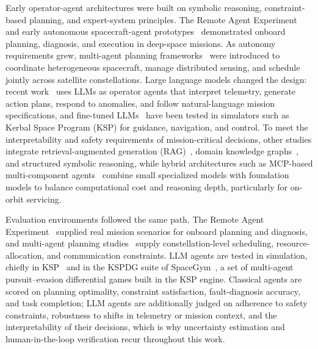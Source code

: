 Early operator-agent architectures were built on symbolic reasoning, constraint-based planning, and expert-system principles.
The Remote Agent Experiment~\cite{bernard1998designremoteagent} and early autonomous spacecraft-agent prototypes~\cite{pell1997autonomousspacecraftagent} demonstrated onboard planning, diagnosis, and execution in deep-space missions.
As autonomy requirements grew, multi-agent planning frameworks~\cite{colby2016autonomousmultiagent,picard2021autonomousAgents} were introduced to coordinate heterogeneous spacecraft, manage distributed sensing, and schedule jointly across satellite constellations.
Large language models changed the design: recent work~\cite{rodriguez2024languagemodelsspacecraft,carrasco2025visualoperatoragents} uses LLMs as operator agents that interpret telemetry, generate action plans, respond to anomalies, and follow natural-language mission specifications, and fine-tuned LLMs~\cite{zucchelli2025finetunellmSpace,carrasco2024finetuneAutonomousSpacecraft,foutter2024spacellava,carrasco2025llmAutonomousSpacecraft} have been tested in simulators such as Kerbal Space Program (KSP) for guidance, navigation, and control. To meet the interpretability and safety requirements of mission-critical decisions, other studies integrate retrieval-augmented generation (RAG)~\cite{belo2025languageragSpaceSpace}, domain knowledge graphs~\cite{powell2025questionknowledgegraphssatellite}, and structured symbolic reasoning, while hybrid architectures such as MCP-based multi-component agents~\cite{wu2025spacemind} combine small specialized models with foundation models to balance computational cost and reasoning depth, particularly for on-orbit servicing.

Evaluation environments followed the same path.
The Remote Agent Experiment~\cite{bernard1998designremoteagent} supplied real mission scenarios for onboard planning and diagnosis, and multi-agent planning studies~\cite{colby2016autonomousmultiagent} supply constellation-level scheduling, resource-allocation, and communication constraints.
LLM agents are tested in simulation, chiefly in KSP~\cite{carrasco2025llmAutonomousSpacecraft} and in the KSPDG suite of SpaceGym~\cite{allen2023spacegym}, a set of multi-agent pursuit--evasion differential games built in the KSP engine.
Classical agents are scored on planning optimality, constraint satisfaction, fault-diagnosis accuracy, and task completion; LLM agents are additionally judged on adherence to safety constraints, robustness to shifts in telemetry or mission context, and the interpretability of their decisions, which is why uncertainty estimation and human-in-the-loop verification recur throughout this work.


